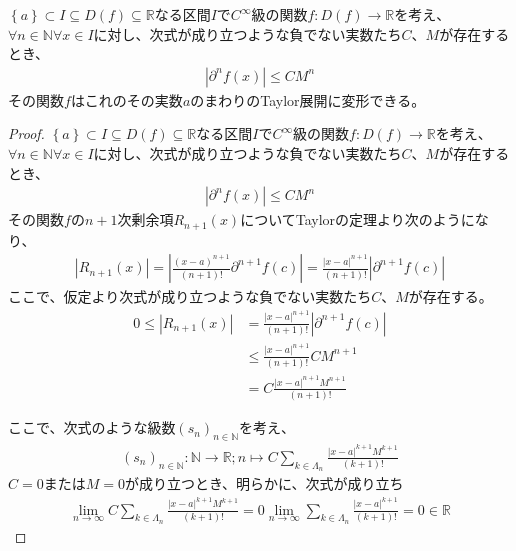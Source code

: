 \documentclass[dvipdfmx]{jsarticle}
\begin{document}
\begin{thm}\label{4.2.2.15}
$\left\{ a \right\} \subset I \subseteq D(f) \subseteq \mathbb{R}$なる区間$I$で$C^{\infty}$級の関数$f:D(f) \rightarrow \mathbb{R}$を考え、$\forall n \in \mathbb{N}\forall x \in I$に対し、次式が成り立つような負でない実数たち$C$、$M$が存在するとき、
\begin{align*}
\left| \partial^{n}f(x) \right| \leq CM^{n}
\end{align*}
その関数$f$はこれのその実数$a$のまわりのTaylor展開に変形できる。
\end{thm}
\begin{proof}
$\left\{ a \right\} \subset I \subseteq D(f) \subseteq \mathbb{R}$なる区間$I$で$C^{\infty}$級の関数$f:D(f) \rightarrow \mathbb{R}$を考え、$\forall n \in \mathbb{N}\forall x \in I$に対し、次式が成り立つような負でない実数たち$C$、$M$が存在するとき、
\begin{align*}
\left| \partial^{n}f(x) \right| \leq CM^{n}
\end{align*}
その関数$f$の$n + 1$次剰余項$R_{n + 1}(x)$についてTaylorの定理より次のようになり、
\begin{align*}
\left| R_{n + 1}(x) \right| = \left| \frac{(x - a)^{n + 1}}{(n + 1)!}\partial^{n + 1}f(c) \right| = \frac{|x - a|^{n + 1}}{(n + 1)!}\left| \partial^{n + 1}f(c) \right|
\end{align*}
ここで、仮定より次式が成り立つような負でない実数たち$C$、$M$が存在する。
\begin{align*}
0 \leq \left| R_{n + 1}(x) \right| &= \frac{|x - a|^{n + 1}}{(n + 1)!}\left| \partial^{n + 1}f(c) \right|\\
&\leq \frac{|x - a|^{n + 1}}{(n + 1)!}CM^{n + 1}\\
&= C\frac{|x - a|^{n + 1}M^{n + 1}}{(n + 1)!}
\end{align*}\par
ここで、次式のような級数$\left( s_{n} \right)_{n \in \mathbb{N}}$を考え、
\begin{align*}
\left( s_{n} \right)_{n \in \mathbb{N}}:\mathbb{N} \rightarrow \mathbb{R};n \mapsto C\sum_{k \in \varLambda_{n}} \frac{|x - a|^{k + 1}M^{k + 1}}{(k + 1)!}
\end{align*}
$C = 0$または$M = 0$が成り立つとき、明らかに、次式が成り立ち
\begin{align*}
\lim_{n \rightarrow \infty}{C\sum_{k \in \varLambda_{n}} \frac{|x - a|^{k + 1}M^{k + 1}}{(k + 1)!}} = 0\lim_{n \rightarrow \infty}{\sum_{k \in \varLambda_{n}} \frac{|x - a|^{k + 1}}{(k + 1)!}} = 0 \in \mathbb{R}
\end{align*}

\end{proof}
\end{document}
